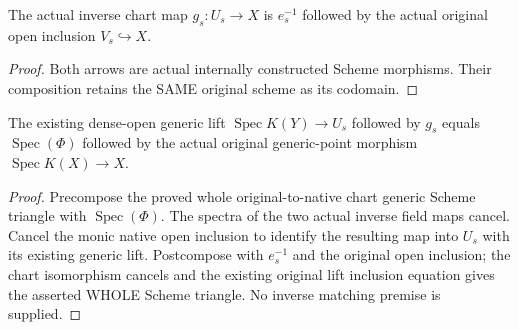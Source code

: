 \begin{definition}
\label{def:seven-original-native-inverse-chart-map-route}
\leanok
{}
The actual inverse chart map $g_s:U_s\to X$ is $e_s^{-1}$ followed by the
actual original open inclusion $V_s\hookrightarrow X$.
\end{definition}
\begin{proof}
Both arrows are actual internally constructed Scheme morphisms. Their
composition retains the SAME original scheme as its codomain.
\end{proof}

\begin{lemma}
\label{lem:seven-original-native-inverse-chart-generic-route}
\leanok
{}
The existing dense-open generic lift $\operatorname{Spec}K(Y)\to U_s$
followed by $g_s$ equals $\operatorname{Spec}(\Phi)$ followed by the actual
original generic-point morphism $\operatorname{Spec}K(X)\to X$.
\end{lemma}
\begin{proof}
Precompose the proved whole original-to-native chart generic Scheme triangle
with $\operatorname{Spec}(\Phi)$. The spectra of the two actual inverse
field maps cancel. Cancel the monic native open inclusion to identify the
resulting map into $U_s$ with its existing generic lift. Postcompose with
$e_s^{-1}$ and the original open inclusion; the chart isomorphism cancels
and the existing original lift inclusion equation gives the asserted WHOLE
Scheme triangle. No inverse matching premise is supplied.
\end{proof}

